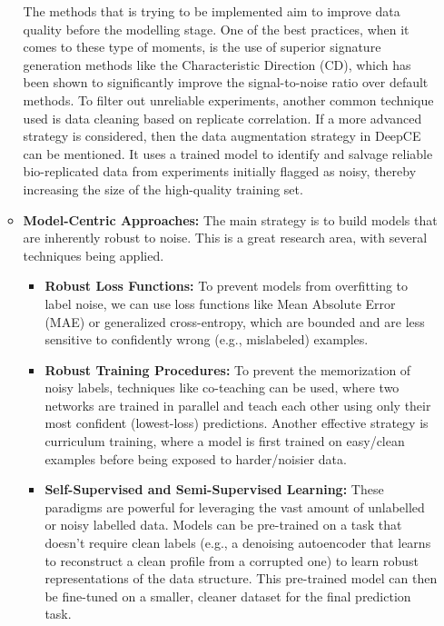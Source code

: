 \documentclass[twocolumn,12pt,a4paper]{article}
\begin{document}
\begin{itemize}
\begin{itemize}
            The methods that is trying to be implemented aim to improve data quality before the modelling stage. One of the best practices, when it comes to these type of moments, is the use of superior signature generation methods like the Characteristic Direction (CD), which has been shown to significantly improve the signal-to-noise ratio over default methods\cite{duan2016l1000cds2}. To filter out unreliable experiments, another common technique used is data cleaning based on replicate correlation\cite{szalai2019signatures}. If a more advanced strategy is considered, then the data augmentation strategy in DeepCE can be mentioned. It uses a trained model to identify and salvage reliable bio-replicated data from experiments initially flagged as noisy, thereby increasing the size of the high-quality training set\cite{pham2021deep}.
                \\
            \item \textbf{Model-Centric Approaches:} 
            The main strategy is to build models that are inherently robust to noise. This is a great research area, with several techniques being applied. 
            \begin{itemize}
            \item \textbf{Robust Loss Functions:} To prevent models from overfitting to label noise, we can use loss functions like Mean Absolute Error (MAE) or generalized cross-entropy, which are bounded and are less sensitive to confidently wrong (e.g., mislabeled) examples\cite{szalai2019signatures}.
            \item \textbf{Robust Training Procedures:} To prevent the memorization of noisy labels, techniques like co-teaching can be used, where two networks are trained in parallel and teach each other using only their most confident (lowest-loss) predictions\cite{szalai2019signatures}. Another effective strategy is curriculum training, where a model is first trained on easy/clean examples before being exposed to harder/noisier data\cite{pham2021deep}.
            \item \textbf{Self-Supervised and Semi-Supervised Learning:} These paradigms are powerful for leveraging the vast amount of unlabelled or noisy labelled data. Models can be pre-trained on a task that doesn't require clean labels (e.g., a denoising autoencoder that learns to reconstruct a clean profile from a corrupted one) to learn robust representations of the data structure. This pre-trained model can then be fine-tuned on a smaller, cleaner dataset for the final prediction task\cite{bang2024transfer}.
    \end{itemize}
  \end{itemize}
\end{itemize}
\end{document}
